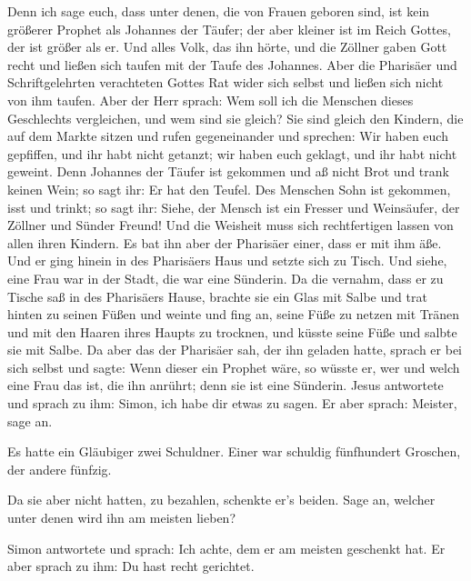  Denn ich sage euch, dass unter denen, die von Frauen
geboren sind, ist kein größerer Prophet als Johannes der Täufer; der
aber kleiner ist im Reich Gottes, der ist größer als er. 
Und alles Volk, das ihn hörte, und die Zöllner gaben Gott recht und
ließen sich taufen mit der Taufe des Johannes.  Aber die
Pharisäer und Schriftgelehrten verachteten Gottes Rat wider sich selbst
und ließen sich nicht von ihm taufen.  Aber der Herr
sprach: Wem soll ich die Menschen dieses Geschlechts vergleichen, und
wem sind sie gleich?  Sie sind gleich den Kindern, die
auf dem Markte sitzen und rufen gegeneinander und sprechen: Wir haben
euch gepfiffen, und ihr habt nicht getanzt; wir haben euch geklagt, und
ihr habt nicht geweint.  Denn Johannes der Täufer ist
gekommen und aß nicht Brot und trank keinen Wein; so sagt ihr: Er hat
den Teufel.  Des Menschen Sohn ist gekommen, isst und
trinkt; so sagt ihr: Siehe, der Mensch ist ein Fresser und Weinsäufer,
der Zöllner und Sünder Freund!  Und die Weisheit muss
sich rechtfertigen lassen von allen ihren Kindern.  Es
bat ihn aber der Pharisäer einer, dass er mit ihm äße. Und er ging
hinein in des Pharisäers Haus und setzte sich zu Tisch. 
Und siehe, eine Frau war in der Stadt, die war eine Sünderin. Da die
vernahm, dass er zu Tische saß in des Pharisäers Hause, brachte sie ein
Glas mit Salbe  und trat hinten zu seinen Füßen und
weinte und fing an, seine Füße zu netzen mit Tränen und mit den Haaren
ihres Haupts zu trocknen, und küsste seine Füße und salbte sie mit
Salbe.  Da aber das der Pharisäer sah, der ihn geladen
hatte, sprach er bei sich selbst und sagte: Wenn dieser ein Prophet
wäre, so wüsste er, wer und welch eine Frau das ist, die ihn anrührt;
denn sie ist eine Sünderin.  Jesus antwortete und sprach
zu ihm: Simon, ich habe dir etwas zu sagen. Er aber sprach: Meister,
sage an.

 Es hatte ein Gläubiger zwei Schuldner. Einer war
schuldig fünfhundert Groschen, der andere fünfzig.

 Da sie aber nicht hatten, zu bezahlen, schenkte er's
beiden. Sage an, welcher unter denen wird ihn am meisten lieben?

 Simon antwortete und sprach: Ich achte, dem er am
meisten geschenkt hat. Er aber sprach zu ihm: Du hast recht gerichtet.

